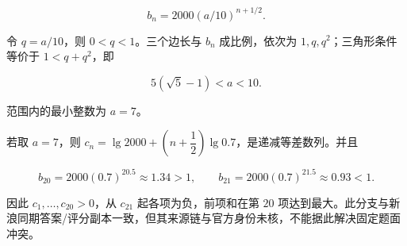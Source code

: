 \begin{answer}
\nopagebreak[4]
\[
b_n=2000(a/10)^{n+1/2}.
\]

令 $q=a/10$，则 $0<q<1$。三个边长与 $b_n$ 成比例，依次为 $1,q,q^2$；三角形条件等价于 $1<q+q^2$，即

\nopagebreak[4]
\[
5(\sqrt5-1)<a<10.
\]

范围内的最小整数为 $a=7$。

若取 $a=7$，则 $c_n=\lg2000+(n+\dfrac12)\lg0.7$，是递减等差数列。并且

\nopagebreak[4]
\[
b_{20}=2000(0.7)^{20.5}\approx1.34>1,
\qquad
b_{21}=2000(0.7)^{21.5}\approx0.93<1.
\]

因此 $c_1,\ldots,c_{20}>0$，从 $c_{21}$ 起各项为负，前项和在第 $20$ 项达到最大。此分支与新浪同期答案/评分副本一致，但其来源链与官方身份未核，不能据此解决固定题面冲突。




\end{answer}
